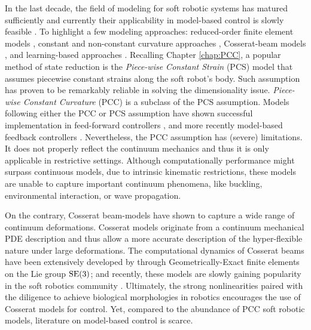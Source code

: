 In the last decade, the field of modeling for soft robotic systems has matured sufficiently and currently their applicability in model-based control is slowly feasible \cite{DellaSantina2021}. To highlight a few modeling approaches: reduced-order finite element models \cite{Duriez2013,Zhang2017,Wu2021}, constant and non-constant curvature approaches \cite{Katzschmann2019,DellaSantina2020}, Cosserat-beam models \cite{Renda2020,Boyer2021}, and learning-based approaches \cite{Bruder2019}. Recalling Chapter \ref{chap:PCC}, a popular method of state reduction is the \textit{Piece-wise Constant Strain} (PCS) model that assumes piecewise constant strains along the soft robot's body. Such assumption has proven to be remarkably reliable in solving the dimensionality issue. \textit{Piece-wise Constant Curvature} (PCC) is a subclass of the PCS assumption. Models following either the PCC or PCS assumption have shown successful implementation in feed-forward controllers \cite{Falkenhahn2015}, and more recently model-based feedback controllers \cite{DellaSantina2020,Katzschmann2019}. Nevertheless, the PCC assumption has (severe) limitations. It does not properly reflect the continuum mechanics and thus it is only applicable in restrictive settings. Although computationally performance might surpass continuous models, due to intrinsic kinematic restrictions, these models are unable to capture important continuum phenomena, like buckling, environmental interaction, or wave propagation.

On the contrary, Cosserat beam-models have shown to capture a wide range of continuum deformations. Cosserat models originate from a continuum mechanical PDE description and thus allow a more accurate description of the hyper-flexible nature under large deformations. The computational dynamics of Cosserat beams have been extensively developed by \cite{Simo1986} through Geometrically-Exact finite elements on the Lie group $\textup{\textrm{SE}}(3)$; and recently, these models are slowly gaining popularity in the soft robotics community \cite{Renda2018,Renda2020,Boyer2021,Till2019,Gazzola2018}. Ultimately, the strong nonlinearities paired with the diligence to achieve biological morphologies in robotics encourages the use of Cosserat models for control. Yet, compared to the abundance of PCC soft robotic models, literature on model-based control is scarce.


